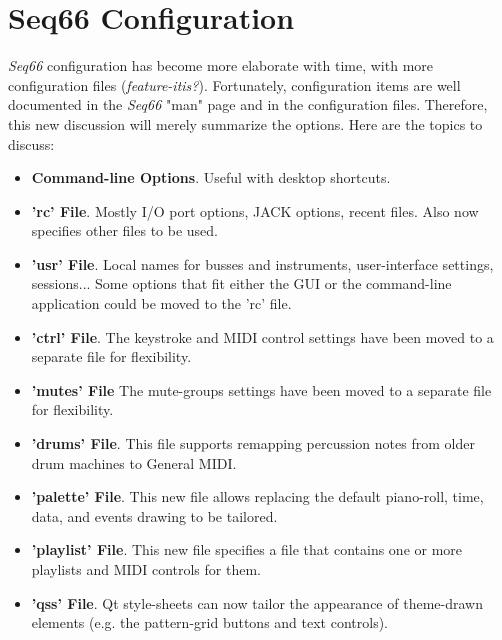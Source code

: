 %
%
%

\section{Seq66 Configuration}
\label{sec:configuration}

   \textsl{Seq66} configuration has become more elaborate with time, with more
   configuration files (\textsl{feature-itis?}).
   Fortunately, configuration items are well documented in the
   \textsl{Seq66} "man" page and in the configuration files.
   Therefore, this new discussion will merely summarize the options.
   Here are the topics to discuss:

   \begin{itemize}
      \item \textbf{Command-line Options}. Useful with desktop shortcuts.
      \item \textbf{'rc' File}. Mostly I/O port options, JACK options, recent
         files.  Also now specifies other files to be used.
      \item \textbf{'usr' File}. Local names for busses and instruments,
         user-interface settings, sessions... Some options that fit either the
         GUI or the command-line application could be moved to the 'rc' file.
      \item \textbf{'ctrl' File}. The keystroke and MIDI control settings have
         been moved to a separate file for flexibility.
      \item \textbf{'mutes' File} The mute-groups settings have
         been moved to a separate file for flexibility.
      \item \textbf{'drums' File}.  This file supports remapping percussion notes
         from older drum machines to General MIDI.
      \item \textbf{'palette' File}. This new file allows replacing the default
         piano-roll, time, data, and events drawing to be tailored.
      \item \textbf{'playlist' File}. This new file specifies a file that
         contains one or more playlists and MIDI controls for them.
      \item \textbf{'qss' File}.  Qt style-sheets can now tailor the appearance
      of theme-drawn elements (e.g. the pattern-grid buttons and text controls).
   \end{itemize}

